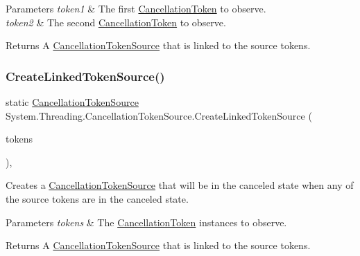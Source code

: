 \begin{DoxyParams}{Parameters}
{\em token1} & The first \hyperlink{}{Cancellation\+Token} to observe.\\
\hline
{\em token2} & The second \hyperlink{}{Cancellation\+Token} to observe.\\
\hline
\end{DoxyParams}
\begin{DoxyReturn}{Returns}
A \hyperlink{}{Cancellation\+Token\+Source} that is linked to the source tokens.
\end{DoxyReturn}
\mbox{\label{class_system_1_1_threading_1_1_cancellation_token_source_ae191709b944a313983bece1bc0ec4bde}} 
\subsubsection{\texorpdfstring{Create\+Linked\+Token\+Source()}{CreateLinkedTokenSource()}\hspace{0.1cm}{\footnotesize\ttfamily [2/2]}}
{\footnotesize\ttfamily static \hyperlink{class_system_1_1_threading_1_1_cancellation_token_source}{Cancellation\+Token\+Source} System.\+Threading.\+Cancellation\+Token\+Source.\+Create\+Linked\+Token\+Source (\begin{DoxyParamCaption}\item[{params \hyperlink{struct_system_1_1_threading_1_1_cancellation_token}{Cancellation\+Token} \mbox{[}$\,$\mbox{]}}]{tokens }\end{DoxyParamCaption})\hspace{0.3cm}{\ttfamily [inline]}, {\ttfamily [static]}}



Creates a \hyperlink{}{Cancellation\+Token\+Source} that will be in the canceled state when any of the source tokens are in the canceled state. 


\begin{DoxyParams}{Parameters}
{\em tokens} & The \hyperlink{}{Cancellation\+Token} instances to observe.\\
\hline
\end{DoxyParams}
\begin{DoxyReturn}{Returns}
A \hyperlink{}{Cancellation\+Token\+Source} that is linked to the source tokens.
\end{DoxyReturn}

